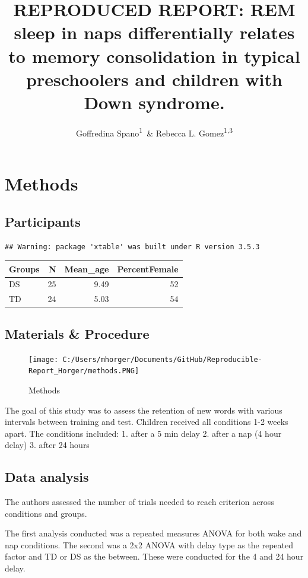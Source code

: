 \documentclass[man,floatsintext]{apa6}
\title{REPRODUCED REPORT: REM sleep in naps differentially relates to memory
consolidation in typical preschoolers and children with Down syndrome.}
\author{Goffredina Spano\textsuperscript{1}~\& Rebecca L.
Gomez\textsuperscript{1,3}}
\date{}
\affiliation{
\vspace{0.5cm}
\textsuperscript{1} University of Arizona\\\textsuperscript{2} University College London}
\begin{document}
\maketitle

\section{Methods}\label{methods}

\subsection{Participants}\label{participants}

\begin{verbatim}
## Warning: package 'xtable' was built under R version 3.5.3
\end{verbatim}

\begin{tabular}{l|r|r|r}
\hline
Groups & N & Mean\_age & PercentFemale\\
\hline
DS & 25 & 9.49 & 52\\
\hline
TD & 24 & 5.03 & 54\\
\hline
\end{tabular}

\subsection{Materials \& Procedure}\label{materials-procedure}

\begin{figure}
\centering
\texttt{[image: C:/Users/mhorger/Documents/GitHub/Reproducible-Report\_Horger/methods.PNG]}
\caption{Methods}
\end{figure}

The goal of this study was to assess the retention of new words with
various intervals between training and test. Children received all
conditions 1-2 weeks apart. The conditions included: 1. after a 5 min
delay 2. after a nap (4 hour delay) 3. after 24 hours

\subsection{Data analysis}\label{data-analysis}

The authors assessed the number of trials needed to reach criterion
across conditions and groups.

The first analysis conducted was a repeated measures ANOVA for both wake
and nap conditions. The second was a 2x2 ANOVA with delay type as the
repeated factor and TD or DS as the between. These were conducted for
the 4 and 24 hour delay.
\end{document}
